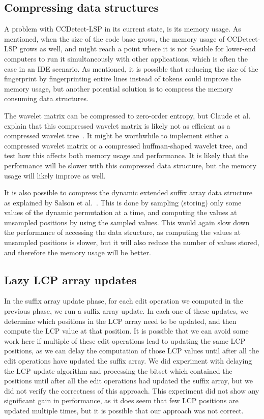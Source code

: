 \subsection*{Compressing data structures}

A problem with CCDetect-LSP in its current state, is its memory usage. As mentioned, when
the size of the code base grows, the memory usage of CCDetect-LSP grows as well, and might
reach a point where it is not feasible for lower-end computers to run it simultaneously
with other applications, which is often the case in an IDE scenario. As mentioned, it is
possible that reducing the size of the fingerprint by fingerprinting entire lines instead
of tokens could improve the memory usage, but another potential solution is to compress
the memory consuming data structures. 

The wavelet matrix can be compressed to zero-order entropy, but Claude et al. explain that
this compressed wavelet matrix is likely not as efficient as a compressed wavelet
tree~\cite{WaveletMatrix}. It might be worthwhile to implement either a compressed wavelet
matrix or a compressed huffman-shaped wavelet tree, and test how this affects both memory
usage and performance. It is likely that the performance will be slower with this
compressed data structure, but the memory usage will likely improve as well.

It is also possible to compress the dynamic extended suffix array data structure as
explained by Salson et al.~\cite{DynamicExtendedSuffixArrays}. This is done by sampling
(storing) only some values of the dynamic permutation at a time, and computing the values
at unsampled positions by using the sampled values. This would again slow down the
performance of accessing the data structure, as computing the values at unsampled
positions is slower, but it will also reduce the number of values stored, and therefore
the memory usage will be better.

\subsection*{Lazy LCP array updates}

In the suffix array update phase, for each edit operation we computed in the previous
phase, we run a suffix array update. In each one of these updates, we determine which
positions in the LCP array need to be updated, and then compute the LCP value at that
position. It is possible that we can avoid some work here if multiple of these edit
operations lead to updating the same LCP positions, as we can delay the computation of
those LCP values until after all the edit operations have updated the suffix array. We did
experiment with delaying the LCP update algorithm and processing the bitset which
contained the positions until after all the edit operations had updated the suffix array,
but we did not verify the correctness of this approach. This experiment did not show any
significant gain in performance, as it does seem that few LCP positions are updated
multiple times, but it is possible that our approach was not correct.

